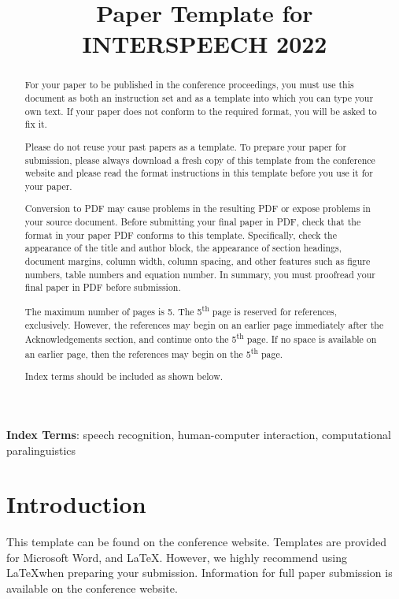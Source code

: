 \documentclass[a4paper]{article}
\title{Paper Template for INTERSPEECH 2022}
\begin{document}
\maketitle
% 
\begin{abstract}
  For your paper to be published in the conference proceedings, you must use this document as both an instruction set and as a template into which you can type your own text. If your paper does not conform to the required format, you will be asked to fix it.

  Please do not reuse your past papers as a template. To prepare your paper for submission, please always download a fresh copy of this template from the conference website and please read the format instructions in this template before you use it for your paper.

  Conversion to PDF may cause problems in the resulting PDF or expose problems in your source document. Before submitting your final paper in PDF, check that the format in your paper PDF conforms to this template. Specifically, check the appearance of the title and author block, the appearance of section headings, document margins, column width, column spacing, and other features such as figure numbers, table numbers and equation number. In summary, you must proofread your final paper in PDF before submission.
  
  The maximum number of pages is 5. The 5\textsuperscript{th} page is reserved for references, exclusively. However, the references may begin on an earlier page immediately after the Acknowledgements section, and continue onto the 5\textsuperscript{th} page. If no space is available on an earlier page, then the references may begin on the 5\textsuperscript{th} page.

  Index terms should be included as shown below.
\end{abstract}
\noindent\textbf{Index Terms}: speech recognition, human-computer interaction, computational paralinguistics

\section{Introduction}

This template can be found on the conference website. Templates are provided for Microsoft Word\textregistered, and \LaTeX. However, we highly recommend using \LaTeX when preparing your submission. Information for full paper submission is available on the conference website.
\end{document}
